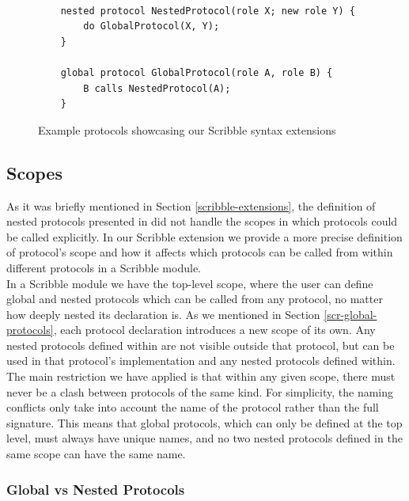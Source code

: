 \documentclass[12pt,twoside]{report}
\begin{document}
\begin{figure}[h]
    \centering
    \lstset{language=Scribble}
    \begin{lstlisting}
    
    nested protocol NestedProtocol(role X; new role Y) {
        do GlobalProtocol(X, Y);
    }
    
    global protocol GlobalProtocol(role A, role B) {
        B calls NestedProtocol(A);
    }
        \end{lstlisting}
        \caption{Example protocols showcasing our Scribble syntax extensions}
        \label{scribble-nested-global}
    \end{figure}{}
 
\subsection{Scopes}

As it was briefly mentioned in Section \ref{scribble-extensions}, the definition of nested protocols presented in \cite{nestedprotocols} did not handle the scopes in which protocols could be called explicitly. In our Scribble extension we provide a more precise definition of protocol's scope and how it affects which protocols can be called from within different protocols in a Scribble module.\\

In a Scribble module we have the top-level scope, where the user can define global and nested protocols which can be called from any protocol, no matter how deeply nested its declaration is. As we mentioned in Section \ref{scr-global-protocols}, each protocol declaration introduces a new scope of its own.  Any nested protocols defined within are not visible outside that  protocol, but can be used in that protocol's implementation and any nested protocols defined within.\\

The main restriction we have applied is that within any given scope, there must never be a clash between protocols of the same kind. For simplicity, the naming conflicts only take into account the name of the protocol rather than the full signature. This means that global protocols, which can only be defined at the top level, must always have unique names, and no two nested protocols defined in the same scope can have the same name.

\subsubsection{Global vs Nested Protocols}
\end{document}
